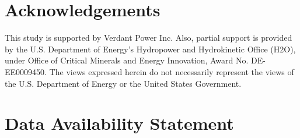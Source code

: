 \documentclass[12pt,sort&compress]{elsarticle}
\theoremstyle{definition}%
\begin{document}
\section{Acknowledgements}
\label{sec:acknowledge}
\noindent This study is supported by Verdant Power Inc. Also, partial support is provided by the U.S. Department of Energy's Hydropower and Hydrokinetic Office (H2O), under Office of Critical Minerals and Energy Innovation, Award No. DE-EE0009450. The views expressed herein do not necessarily represent the views of the U.S. Department of Energy or the United States Government.

\section{Data Availability Statement} 
\label{sec:7} 


\begin{table} [H]
  \caption{}
  \begin{tabular} {>{\arraybackslash}p{4cm} >{\arraybackslash}p{3cm} >{\arraybackslash}p{3cm} >{\arraybackslash}p{3cm}}
    
    \bottomrule
  \end{tabular}
  
  \label{tab:4}
\end{table}


\begin{figure} [H]
  \caption{}
  \label{}
  \label{}
\end{figure}

 

\end{document}
